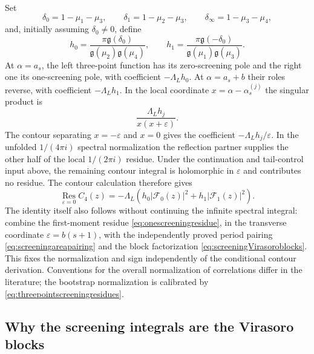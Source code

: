 \documentclass[11pt,a4paper]{article}
\numberwithin{equation}{section}
\theoremstyle{definition}
\theoremstyle{remark}
\begin{document}
Set
\begin{equation}
 \delta_0=1-\mu_1-\mu_3,\qquad
 \delta_1=1-\mu_2-\mu_3,\qquad
 \delta_\infty=1-\mu_3-\mu_4,
 \label{eq:screeningexponentdifferences}
\end{equation}
and, initially assuming $\delta_0\ne0$, define
\begin{equation}
 h_0=\frac{\pi\mathfrak g(\delta_0)}
              {\mathfrak g(\mu_2)\mathfrak g(\mu_4)},
 \qquad
 h_1=\frac{\pi\mathfrak g(-\delta_0)}
              {\mathfrak g(\mu_1)\mathfrak g(\mu_3)}.
 \label{eq:screeningHermitiancoefficients}
\end{equation}
At $\alpha=a_s$, the left three-point function has its
zero-screening pole and the right one its one-screening pole,
with coefficient $-\Lambda_Lh_0$. At $\alpha=a_s+b$ their
roles reverse, with coefficient $-\Lambda_Lh_1$.
In the local coordinate $x=\alpha-\alpha_s^{(j)}$ the singular
product is
\[
 \frac{\Lambda_Lh_j}{x(x+\varepsilon)}.
\]
The contour separating $x=-\varepsilon$ and $x=0$ gives the
coefficient $-\Lambda_Lh_j/\varepsilon$. In the unfolded
$1/(4\pi i)$ spectral normalization the reflection partner
supplies the other half of the local $1/(2\pi i)$ residue.
Under the continuation and tail-control input above, the remaining
contour integral is holomorphic in $\varepsilon$ and contributes
no residue. The contour calculation therefore gives
\begin{equation}
 \boxed{\quad
 \operatorname*{Res}_{\varepsilon=0}C_4(z)
  =-\Lambda_L\left(
      h_0|\mathcal F_0(z)|^2+h_1|\mathcal F_1(z)|^2\right).
 \quad}
 \label{eq:spectralonescreeningresidue}
\end{equation}
The identity itself also follows without continuing the infinite
spectral integral: combine the first-moment residue
\eqref{eq:onescreeningresidue}, in the transverse coordinate
$\varepsilon=b(s+1)$, with the independently proved period pairing
\eqref{eq:screeningareapairing} and the block factorization
\eqref{eq:screeningVirasoroblocks}. This fixes the normalization
and sign independently of the conditional contour derivation.
Conventions for the overall normalization of correlations differ
in the literature; the bootstrap normalization is calibrated by
\eqref{eq:threepointscreeningresidues}.

\subsection{Why the screening integrals are the Virasoro blocks}
\end{document}
